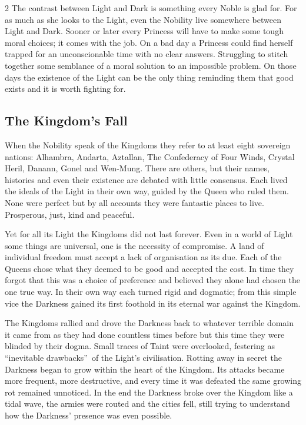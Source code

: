 \begin{multicols}{2}
The contrast between Light and Dark is something every Noble is glad for. For as much as she looks to the Light, even the Nobility live somewhere between Light and Dark. Sooner or later every Princess will have to make some tough moral choices; it comes with the job. On a bad day a Princess could find herself trapped for an unconscionable time with no clear answers. Struggling to stitch together some semblance of a moral solution to an impossible problem. On those days the existence of the Light can be the only thing reminding them that good exists and it is worth fighting for. 

\subsection*{The Kingdom's Fall}%

When the Nobility speak of the Kingdoms they refer to at least eight sovereign nations: Alhambra, Andarta, Aztallan, The Confederacy of Four Winds, Crystal Heril, Danann, Gonel and Wen-Mung. There are others, but their names, histories and even their existence are debated with little consensus. Each lived the ideals of the Light in their own way, guided by the Queen who ruled them. None were perfect but by all accounts they were fantastic places to live. Prosperous, just, kind and peaceful. 

Yet for all its Light the Kingdoms did not last forever. Even in a world of Light some things are universal, one is the necessity of compromise. A land of individual freedom must accept a lack of organisation as its due. Each of the Queens chose what they deemed to be good and accepted the cost. In time they forgot that this was a choice of preference and believed they alone had chosen the one true way. In their own way each turned rigid and dogmatic; from this simple vice the Darkness gained its first foothold in its eternal war against the Kingdom. 

The Kingdoms rallied and drove the Darkness back to whatever terrible domain it came from as they had done countless times before but this time they were blinded by their dogma. Small traces of Taint were overlooked, festering as \textquotedblleft inevitable drawbacks\textquotedblright\, of the Light's civilisation. Rotting away in secret the Darkness began to grow within the heart of the Kingdom. Its attacks became more frequent, more destructive, and every time it was defeated the same growing rot remained unnoticed. In the end the Darkness broke over the Kingdom like a tidal wave, the armies were routed and the cities fell, still trying to understand how the Darkness' presence was even possible. 


\end{multicols}
